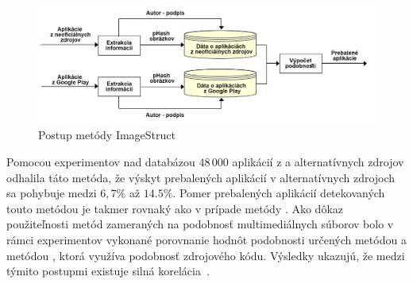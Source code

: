 \begin{figure}[htb]
  \begin{center}
    \includegraphics[width=130mm]{images/ImageStruct.png}
  \end{center}
  \caption{Postup metódy ImageStruct}
  \label{fig:strukturaApk}
\end{figure}

Pomocou experimentov nad databázou $48\,000$ aplikácií z  a alternatívnych zdrojov odhalila táto metóda, že výskyt prebalených aplikácií v alternatívnych zdrojoch sa pohybuje medzi $6,7 \%$ až $14.5 \%$.
Pomer prebalených aplikácií detekovaných touto metódou je takmer rovnaký ako v prípade metódy . Ako dôkaz použiteľnosti metód zameraných na podobnosť multimediálnych súborov bolo v rámci experimentov vykonané porovnanie hodnôt podobnosti určených metódou  a metódou , ktorá využíva podobnosť zdrojového kódu. Výsledky ukazujú, že medzi týmito postupmi existuje silná korelácia~\cite{ImageStruct}. 
